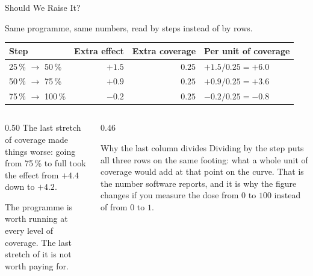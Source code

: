 \documentclass[main.tex]{subfiles}
\begin{document}
\begin{frame}{Should We Raise It?}

  Same programme, same numbers, read by steps instead of by rows.

  \medskip
  \begin{center}\small
  \begin{tabular}{@{}lrrl@{}}
    \toprule
    Step & Extra effect & Extra coverage & Per unit of coverage \\
    \midrule
    25\,\% $\to$ 50\,\%  & $+1.5$ & $0.25$ & $+1.5 / 0.25 = +6.0$ \\
    50\,\% $\to$ 75\,\%  & $+0.9$ & $0.25$ & $+0.9 / 0.25 = +3.6$ \\
    75\,\% $\to$ 100\,\% & \alert{$-0.2$} & $0.25$ & \alert{$-0.2 / 0.25 = -0.8$} \\
    \bottomrule
  \end{tabular}
  \end{center}

  \medskip
  \begin{columns}[T]
    \begin{column}{0.50\textwidth}
      The last stretch of coverage \alert{made things worse}: going from
      75\,\% to full took the effect from $+4.4$ down to $+4.2$.

      \smallskip
      The programme is worth running at every level of coverage. The last
      stretch of it is not worth paying for.
    \end{column}
    \begin{column}{0.46\textwidth}
      \begin{block}{\footnotesize Why the last column divides}
        \footnotesize
        Dividing by the step puts all three rows on the same footing: what a
        whole unit of coverage would add at that point on the curve. That is
        the number software reports, and it is why the figure changes if you
        measure the dose from $0$ to $100$ instead of from $0$ to $1$.
      \end{block}
    \end{column}
  \end{columns}

\end{frame}
\end{document}
